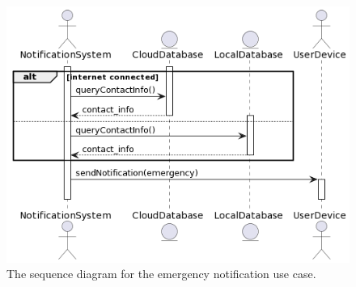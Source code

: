 \begin{figure}
    \centering
    \includegraphics[width=\imagewidth]{../assets/sequence/EmergencyResponseUseCase.png}
    \caption{The sequence diagram for the emergency notification use case.}
    \label{fig:emergency-resp}
\end{figure}
